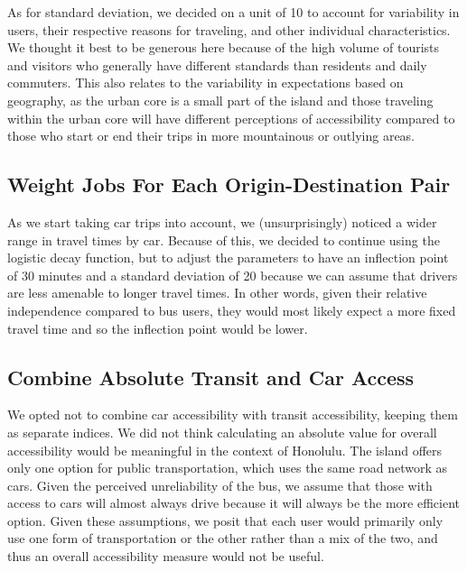\documentclass[
]{article}
\begin{document}
As for standard deviation, we decided on a unit of 10 to account for
variability in users, their respective reasons for traveling, and other
individual characteristics. We thought it best to be generous here
because of the high volume of tourists and visitors who generally have
different standards than residents and daily commuters. This also
relates to the variability in expectations based on geography, as the
urban core is a small part of the island and those traveling within the
urban core will have different perceptions of accessibility compared to
those who start or end their trips in more mountainous or outlying
areas.

\hypertarget{weight-jobs-for-each-origin-destination-pair}{%
\subsection{Weight Jobs For Each Origin-Destination
Pair}\label{weight-jobs-for-each-origin-destination-pair}}

As we start taking car trips into account, we (unsurprisingly) noticed a
wider range in travel times by car. Because of this, we decided to
continue using the logistic decay function, but to adjust the parameters
to have an inflection point of 30 minutes and a standard deviation of 20
because we can assume that drivers are less amenable to longer travel
times. In other words, given their relative independence compared to bus
users, they would most likely expect a more fixed travel time and so the
inflection point would be lower.

\hypertarget{combine-absolute-transit-and-car-access}{%
\subsection{Combine Absolute Transit and Car
Access}\label{combine-absolute-transit-and-car-access}}

We opted not to combine car accessibility with transit accessibility,
keeping them as separate indices. We did not think calculating an
absolute value for overall accessibility would be meaningful in the
context of Honolulu. The island offers only one option for public
transportation, which uses the same road network as cars. Given the
perceived unreliability of the bus, we assume that those with access to
cars will almost always drive because it will always be the more
efficient option. Given these assumptions, we posit that each user would
primarily only use one form of transportation or the other rather than a
mix of the two, and thus an overall accessibility measure would not be
useful.
\end{document}

